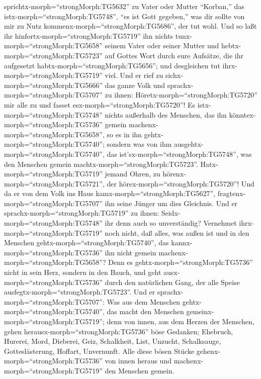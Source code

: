 sprichtx-morph=``strongMorph:TG5632'' zu Vater oder Mutter ``Korban,''
das istx-morph=``strongMorph:TG5748'', ``es ist Gott gegeben,'' was dir
sollte von mir zu Nutz kommenx-morph=``strongMorph:TG5686'', der tut
wohl.  Und so laßt ihr
hinfortx-morph=``strongMorph:TG5719'' ihn nichts
tunx-morph=``strongMorph:TG5658'' seinem Vater oder seiner Mutter
 und hebtx-morph=``strongMorph:TG5723'' auf Gottes Wort
durch eure Aufsätze, die ihr aufgesetzt
habtx-morph=``strongMorph:TG5656''; und desgleichen tut
ihrx-morph=``strongMorph:TG5719'' viel.  Und er rief zu
sichx-morph=``strongMorph:TG5666'' das ganze Volk und
sprachx-morph=``strongMorph:TG5707'' zu ihnen:
Höretx-morph=``strongMorph:TG5720'' mir alle zu und fasset
esx-morph=``strongMorph:TG5720''!  Es
istx-morph=``strongMorph:TG5748'' nichts außerhalb des Menschen, das ihn
könntex-morph=``strongMorph:TG5736'' gemein
machenx-morph=``strongMorph:TG5658'', so es in ihn
gehtx-morph=``strongMorph:TG5740''; sondern was von ihm
ausgehtx-morph=``strongMorph:TG5740'', das
ist'sx-morph=``strongMorph:TG5748'', was den Menschen gemein
machtx-morph=``strongMorph:TG5723''. 
Hatx-morph=``strongMorph:TG5719'' jemand Ohren, zu
hörenx-morph=``strongMorph:TG5721'', der
hörex-morph=``strongMorph:TG5720''!  Und da er von dem Volk
ins Haus kamx-morph=``strongMorph:TG5627'',
fragtenx-morph=``strongMorph:TG5707'' ihn seine Jünger um dies
Gleichnis.  Und er sprachx-morph=``strongMorph:TG5719'' zu
ihnen: Seidx-morph=``strongMorph:TG5748'' ihr denn auch so unverständig?
Vernehmet ihrx-morph=``strongMorph:TG5719'' noch nicht, daß alles, was
außen ist und in den Menschen gehtx-morph=``strongMorph:TG5740'', das
kannx-morph=``strongMorph:TG5736'' ihn nicht gemein
machenx-morph=``strongMorph:TG5658''?  Denn es
gehtx-morph=``strongMorph:TG5736'' nicht in sein Herz, sondern in den
Bauch, und geht ausx-morph=``strongMorph:TG5736'' durch den natürlichen
Gang, der alle Speise ausfegtx-morph=``strongMorph:TG5723''.
 Und er sprachx-morph=``strongMorph:TG5707'': Was aus dem
Menschen gehtx-morph=``strongMorph:TG5740'', das macht den Menschen
gemeinx-morph=``strongMorph:TG5719'';  denn von innen, aus
dem Herzen der Menschen, gehen herausx-morph=``strongMorph:TG5736'' böse
Gedanken; Ehebruch, Hurerei, Mord,  Dieberei, Geiz,
Schalkheit, List, Unzucht, Schalksauge, Gotteslästerung, Hoffart,
Unvernunft.  Alle diese bösen Stücke
gehenx-morph=``strongMorph:TG5736'' von innen heraus und
machenx-morph=``strongMorph:TG5719'' den Menschen gemein. 
